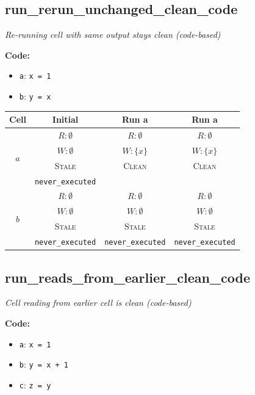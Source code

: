 \documentclass{article}
\begin{document}
\subsection{run\_rerun\_unchanged\_clean\_code}
\textit{Re-running cell with same output stays clean (code-based)}

\textbf{Code:}
\begin{itemize}
  \item \texttt{a}: \verb|x = 1|
  \item \texttt{b}: \verb|y = x|
\end{itemize}

\begin{center}
\small
\begin{tabular}{|c|c|c|c|}
\hline
\textbf{Cell} & \textbf{Initial} & \textbf{Run a} & \textbf{Run a} \\
\hline
\multirow{4}{*}{$a$}
  & $R: \emptyset$ & $R: \emptyset$ & $R: \emptyset$ \\
  & $W: \emptyset$ & $W: \{x\}$ & $W: \{x\}$ \\
  & \textsc{Stale} & \textsc{Clean} & \textsc{Clean} \\
  & \footnotesize\texttt{never\_executed} &  &  \\
\hline
\multirow{4}{*}{$b$}
  & $R: \emptyset$ & $R: \emptyset$ & $R: \emptyset$ \\
  & $W: \emptyset$ & $W: \emptyset$ & $W: \emptyset$ \\
  & \textsc{Stale} & \textsc{Stale} & \textsc{Stale} \\
  & \footnotesize\texttt{never\_executed} & \footnotesize\texttt{never\_executed} & \footnotesize\texttt{never\_executed} \\
\hline
\end{tabular}
\end{center}


\subsection{run\_reads\_from\_earlier\_clean\_code}
\textit{Cell reading from earlier cell is clean (code-based)}

\textbf{Code:}
\begin{itemize}
  \item \texttt{a}: \verb|x = 1|
  \item \texttt{b}: \verb|y = x + 1|
  \item \texttt{c}: \verb|z = y|
\end{itemize}
\end{document}
